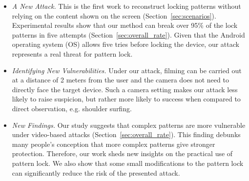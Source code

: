 \begin{itemize}
\item \emph{A New Attack.} This is the first work to reconstruct locking patterns without relying on
the content shown on the screen (Section~\ref{sec:scenarios}). %
Experimental results show that our method can break over
95\% of the lock patterns in five attempts (Section~\ref{sec:overall_rate}). Given that the Android
operating system (OS) allows five tries before
locking the device, our attack represents a real threat for pattern lock.

\item \emph{Identifying New Vulnerabilities.} Under our attack, filming can be carried out at a distance of 2 meters from the user and the camera does not need to directly face the target device. Such a camera setting makes our attack less likely to raise suspicion, but rather more likely to success when compared to direct observation, e.g. shoulder surfing.


\item \emph{New Findings.} Our study suggests that complex patterns are more vulnerable
under video-based attacks (Section~\ref{sec:overall_rate}). This finding debunks many people's conception
that more complex patterns give stronger protection. Therefore, our work sheds new insights on
 the practical use of pattern lock. We also show that some small modifications to the
 pattern lock can significantly reduce the risk of the presented attack.

\end{itemize}

